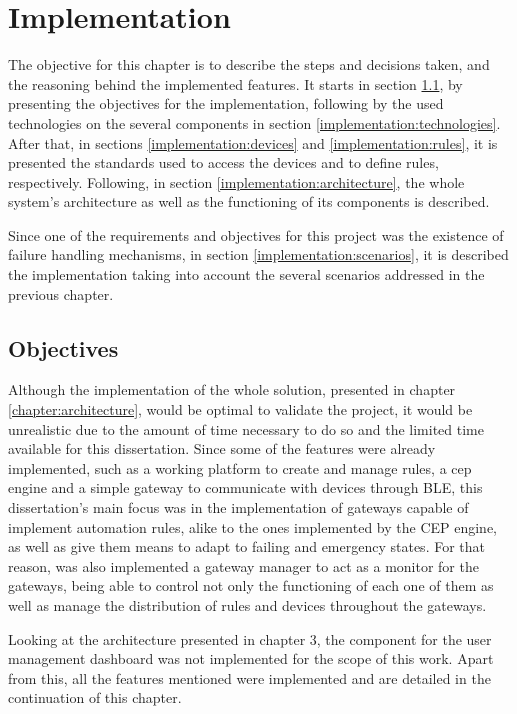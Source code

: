 \chapter{Implementation}
\label{chapter:implementation}

The objective for this chapter is to describe the steps and decisions taken, and the reasoning behind the implemented features. It starts in section \ref{implementation:objectives}, by presenting the objectives for the implementation, following by the used technologies on the several components in section \ref{implementation:technologies}. After that, in sections \ref{implementation:devices} and \ref{implementation:rules}, it is presented the standards used to access the devices and to define rules, respectively. Following, in section \ref{implementation:architecture}, the whole system's architecture as well as the functioning of its components is described. 

Since one of the requirements and objectives for this project was the existence of failure handling mechanisms, in section \ref{implementation:scenarios}, it is described the implementation taking into account the several scenarios addressed in the previous chapter. 

\newpage

\section{Objectives}
\label{implementation:objectives}

Although the implementation of the whole solution, presented in chapter \ref{chapter:architecture}, would be optimal to validate the project, it would be unrealistic due to the amount of time necessary to do so and the limited time available for this dissertation. Since some of the features were already implemented, such as a working platform to create and manage rules, a \ac{cep} engine and a simple gateway to communicate with devices through BLE, this dissertation's main focus was in the implementation of gateways capable of implement automation rules, alike to the ones implemented by the CEP engine, as well as give them means to adapt to failing and emergency states. For that reason, was also implemented a gateway manager to act as a monitor for the gateways, being able to control not only the functioning of each one of them as well as manage the distribution of rules and devices throughout the gateways.

Looking at the architecture presented in chapter 3, the component for the user management dashboard was not implemented for the scope of this work. Apart from this, all the features mentioned were implemented and are detailed in the continuation of this chapter.



